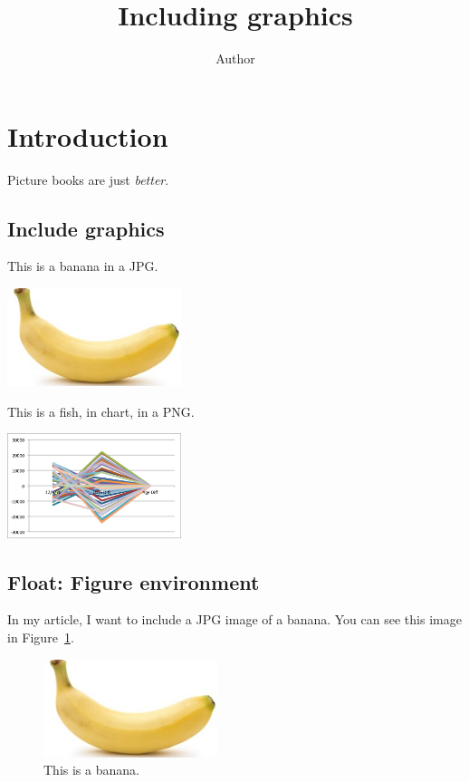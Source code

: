 \documentclass{proc}
\title{Including graphics}
\author{Author}
\date{}
\begin{document}
    \maketitle

    \section{Introduction}

        Picture books are just \emph{better}.

        \subsection{Include graphics}

        This is a banana in a JPG.

        \includegraphics[width=2in]{src/examples/assets/img/Banana.jpg} %

        This is a fish, in chart, in a PNG.

        \includegraphics[width=2in]{src/examples/assets/img/Fish.png}

        \subsection{Float: Figure environment}

        In my article, I want to include a JPG image of a banana. You can see this image in Figure~\ref{fig:banana}.

        \begin{figure}[htbp]
            \begin{center}
                \includegraphics[width=2in]{src/examples/assets/img/Banana.jpg}
                \caption{This is a banana.}
            \end{center}
            \label{fig:banana}
        \end{figure}
\end{document}
